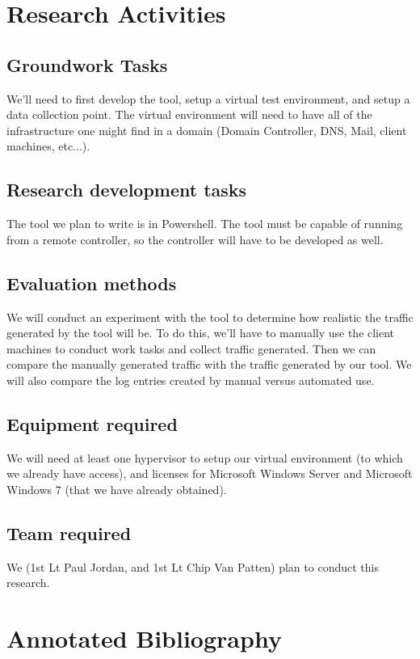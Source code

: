 \documentclass{article}
\begin{document}
\section{Research Activities}
\subsection{Groundwork Tasks}
We'll need to first develop the tool, setup a virtual test environment, and setup
a data collection point.  The virtual environment will need to have all of the
infrastructure one might find in a domain (Domain Controller, DNS, Mail, client
machines, etc...).

\subsection{Research development tasks}
The tool we plan to write is in Powershell.  The tool must be capable of
running from a remote controller, so the controller will have to be developed as
well.

\subsection{Evaluation methods}
We will conduct an experiment with the tool to determine how realistic the
traffic generated by the tool will be.  To do this, we'll have to manually use
the client machines to conduct work tasks and collect traffic generated.  Then
we can compare the manually generated traffic with the traffic generated by our
tool.  We will also compare the log entries created by manual versus automated
use. 

\subsection{Equipment required}
We will need at least one hypervisor to setup our virtual environment (to which
we already have access), and licenses for Microsoft Windows Server and
Microsoft Windows 7 (that we have already obtained).

\subsection{Team required}
We (1st Lt Paul Jordan, and 1st Lt Chip Van Patten) plan to conduct this
research.

\section{Annotated Bibliography}
\nocite{*}


{}
\end{document}
